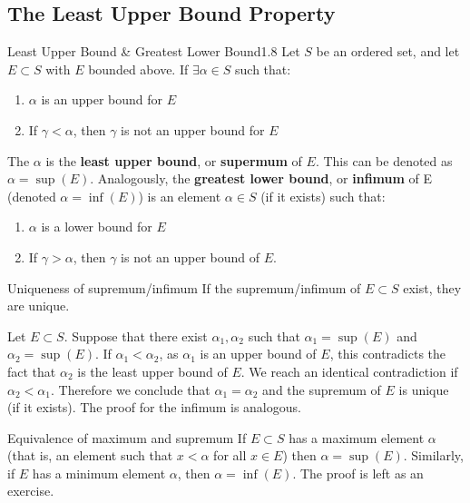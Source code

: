 \subsection{The Least Upper Bound Property}
\begin{definition}{Least Upper Bound \& Greatest Lower Bound}{1.8}
    Let $S$ be an ordered set, and let $E \subset S$ with $E$ bounded above. If $\exists \alpha \in S$ such that:
    \begin{enumerate}
        \item $\alpha$ is an upper bound for $E$
        \item If $\gamma < \alpha$, then $\gamma$ is not an upper bound for $E$
    \end{enumerate} 
    The $\alpha$ is the \textbf{least upper bound}, or \textbf{supermum} of $E$. This can be denoted as $\alpha = \sup(E)$. Analogously, the \textbf{greatest lower bound}, or \textbf{infimum} of E (denoted $\alpha = \inf(E)$) is an element $\alpha \in S$ (if it exists) such that:
    \begin{enumerate}
        \item $\alpha$ is a lower bound for $E$
        \item If $\gamma > \alpha$, then $\gamma$ is not an upper bound of $E$. 
    \end{enumerate}
\end{definition}

\begin{ntheorem}{Uniqueness of supremum/infimum}
    If the supremum/infimum of $E \subset S$ exist, they are unique.
\end{ntheorem}
\begin{nproof}
        Let $E \subset S$. Suppose that there exist $\alpha_1, \alpha_2$ such that $\alpha_1 = \sup(E)$ and $\alpha_2 = \sup(E)$. If $\alpha_1 < \alpha_2$, as $\alpha_1$ is an upper bound of $E$, this contradicts the fact that $\alpha_2$ is the least upper bound of $E$. We reach an identical contradiction if $\alpha_2 < \alpha_1$. Therefore we conclude that $\alpha_1 = \alpha_2$ and the supremum of $E$ is unique (if it exists). The proof for the infimum is analogous. 
\end{nproof}

\begin{ntheorem}{Equivalence of maximum and supremum}
    If $E \subset S$ has a maximum element $\alpha$ (that is, an element such that $x < \alpha$ for all $x \in E$) then $\alpha = \sup(E)$. Similarly, if $E$ has a minimum element $\alpha$, then $\alpha = \inf(E)$. The proof is left as an exercise. 
\end{ntheorem}

